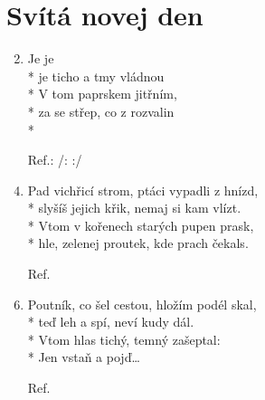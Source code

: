 \section{Svítá novej den}
\begin{enumerate}
\item[]   
\item Je  je  \\*
je  ticho a tmy vládnou \\*
V tom paprskem jitřním, \\*
za se střep, co z rozvalin \\*
\item[Ref.:] /:   :/
\item Pad vichřicí strom, ptáci vypadli z hnízd,\\*
slyšíš jejich křik, nemaj si kam vlízt.\\*
Vtom v kořenech starých pupen prask,\\*
hle, zelenej proutek, kde prach čekals.  
\item[Ref.]\,
\item Poutník, co šel cestou, hložím podél skal,\\*
teď leh a spí, neví kudy dál.\\*
Vtom hlas tichý, temný zašeptal:\\*
Jen vstaň a pojď…   
\item[Ref.]\,
\end{enumerate}
